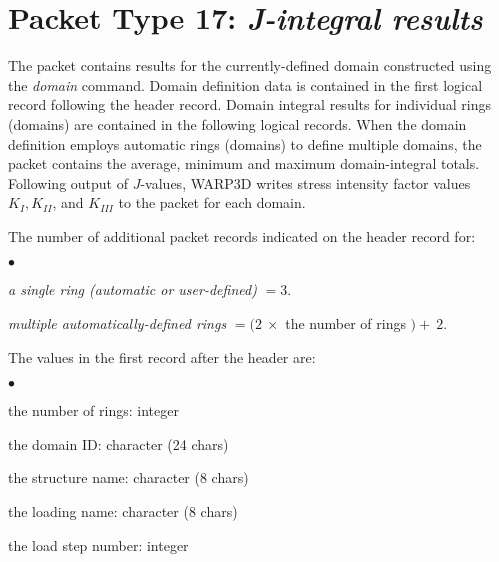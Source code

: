 \documentclass[10pt]{report}
\numberwithin{equation}{section}
\newcommand{\ti}{\emph}
\newcommand{\squishlist}{
 \begin{list}{$\bullet$}
  { \setlength{\itemsep}{0pt}
     \setlength{\parsep}{3pt}
     \setlength{\topsep}{3pt}
     \setlength{\partopsep}{0pt}
     \setlength{\leftmargin}{1.5em}
     \setlength{\labelwidth}{1em}
     \setlength{\labelsep}{0.5em} } }
\newcommand{\squishend}{
  \end{list}  }
\begin{document}
%
%
\section{Packet Type 17: \ti{J-integral results}}
The packet contains results for the currently-defined domain constructed using 
the \ti{domain} command. Domain definition data is contained in the first 
logical record following the header record. Domain integral results for 
individual rings (domains) are contained in the following logical records. When 
the domain definition employs automatic rings (domains) to define multiple domains,
the packet contains the average, minimum and maximum domain-integral 
totals. Following output of $J$-values, WARP3D writes stress intensity factor 
values $K_I, K_{II}$, and $K_{III}$ to the packet for each domain.

\noindent The number of additional packet records indicated on the header record for:
\squishlist
\item \ti{a single ring (automatic or user-defined)} $=3$.
\item \ti{multiple automatically-defined rings} $= (2\ \times$ the number of rings $)+\ 2$.
\squishend
\noindent The values in the first record after the header are:   
\squishlist
\item the number of rings: integer
\item the domain ID: character (24 chars)
\item the structure name: character (8 chars)
\item the loading name: character (8 chars)
\item the load step number: integer
\squishend
\end{document}
